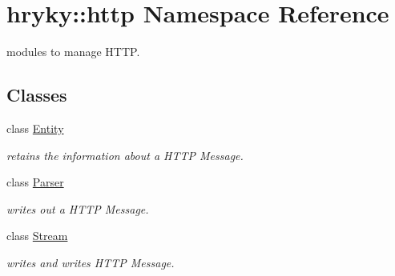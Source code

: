 \hypertarget{namespacehryky_1_1http}{\section{hryky\-:\-:http Namespace Reference}
\label{namespacehryky_1_1http}
}


modules to manage H\-T\-T\-P.  


\subsection*{Classes}
\begin{DoxyCompactItemize}
\item 
class \hyperlink{classhryky_1_1http_1_1_entity}{Entity}
\begin{DoxyCompactList}\small\item\em retains the information about a H\-T\-T\-P Message. \end{DoxyCompactList}\item 
class \hyperlink{classhryky_1_1http_1_1_parser}{Parser}
\begin{DoxyCompactList}\small\item\em writes out a H\-T\-T\-P Message. \end{DoxyCompactList}\item 
class \hyperlink{classhryky_1_1http_1_1_stream}{Stream}
\begin{DoxyCompactList}\small\item\em writes and writes H\-T\-T\-P Message. \end{DoxyCompactList}\end{DoxyCompactItemize}
